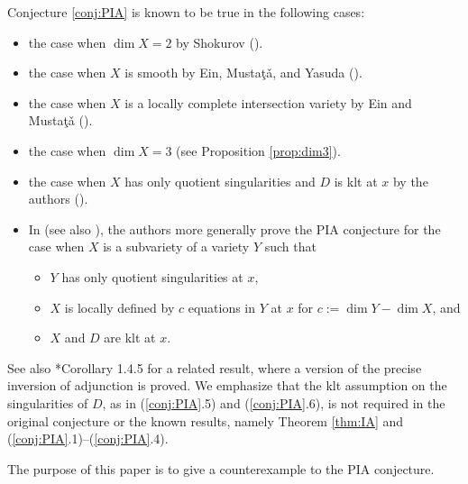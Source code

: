 \documentclass[a4paper,11pt]{amsart}
\theoremstyle{definition}
\theoremstyle{remark}
\begin{document}
Conjecture \ref{conj:PIA} is known to be true in the following cases: 
\begin{itemize}
\item[({\ref{conj:PIA}}.1)]
the case when $\dim X = 2$ by Shokurov (\cite{Sho93}). 

\item[({\ref{conj:PIA}}.2)]
the case when $X$ is smooth by Ein, Musta{\c{t}}{\v{a}}, and Yasuda (\cite{EMY03}). 

\item[({\ref{conj:PIA}}.3)]
the case when $X$ is a locally complete intersection variety by Ein and Musta{\c{t}}{\v{a}} (\cite{EM04}). 

\item[({\ref{conj:PIA}}.4)]
the case when $\dim X = 3$ (see Proposition \ref{prop:dim3}). 

\item[({\ref{conj:PIA}}.5)]
the case when $X$ has only quotient singularities and $D$ is klt at $x$ by the authors (\cites{NS22, NS2}). 

\item[({\ref{conj:PIA}}.6)]
In \cites{NS22, NS2} (see also \cite{NS3}), the authors more generally prove the PIA conjecture for the case when $X$ is a subvariety of a variety $Y$ such that 
\begin{itemize}
\item 
$Y$ has only quotient singularities at $x$, 

\item 
$X$ is locally defined by $c$ equations in $Y$ at $x$ for $c := \dim Y - \dim X$, and 

\item 
$X$ and $D$ are klt at $x$. 
\end{itemize}
\end{itemize}
See also \cite{BCHM}*{Corollary 1.4.5} for a related result, where a version of the precise inversion of adjunction is proved.
We emphasize that the klt assumption on the singularities of $D$, as in ({\ref{conj:PIA}}.5) and ({\ref{conj:PIA}}.6), is not required in the original conjecture or the known results, namely Theorem \ref{thm:IA} and ({\ref{conj:PIA}}.1)--({\ref{conj:PIA}}.4). 

The purpose of this paper is to give a counterexample to the PIA conjecture. 
\end{document}

